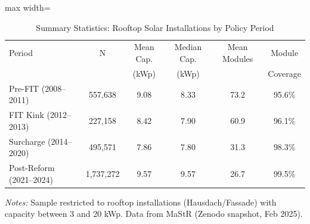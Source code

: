 \begin{table}[t]
\centering
\caption{Summary Statistics: Rooftop Solar Installations by Policy Period}
\label{tab:summary}
\begin{adjustbox}{max width=\textwidth}
\begin{tabular}{lccccc}
\toprule
Period & N & Mean Cap. & Median Cap. & Mean Modules & Module \\
 & & (kWp) & (kWp) & & Coverage \\
\midrule
Pre-FIT (2008--2011) &   557,638 & 9.08 & 8.33 & 73.2 & 95.6\% \\
FIT Kink (2012--2013) &   227,158 & 8.42 & 7.90 & 60.9 & 96.1\% \\
Surcharge (2014--2020) &   495,571 & 7.86 & 7.80 & 31.3 & 98.3\% \\
Post-Reform (2021--2024) & 1,737,272 & 9.57 & 9.57 & 26.7 & 99.5\% \\
\bottomrule
\end{tabular}
\end{adjustbox}

\begin{flushleft}\small \textit{Notes:} Sample restricted to rooftop installations (Hausdach/Fassade) with capacity between 3 and 20 kWp. Data from MaStR (Zenodo snapshot, Feb 2025).\end{flushleft}

\end{table}

